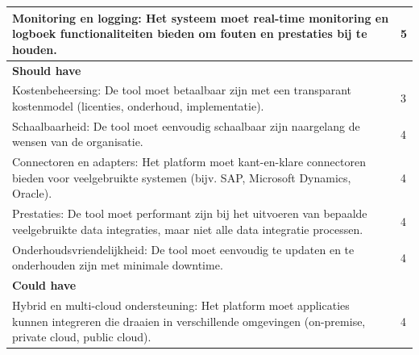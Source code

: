 \begin{landscape}
\begin{table}[H]
{\begin{tabular}{|ll|}
\multicolumn{1}{|l|}{Monitoring en logging: Het systeem moet real-time monitoring en logboek functionaliteiten bieden om fouten en prestaties bij te houden.}                                                              & 5                            \\ \hline
\textbf{Should have}                                                                                                                                                                                                       &                              \\ \hline
\multicolumn{1}{|l|}{Kostenbeheersing: De tool moet betaalbaar zijn met een transparant kostenmodel (licenties, onderhoud, implementatie).}                                                                                & 3                            \\ \hline
\multicolumn{1}{|l|}{Schaalbaarheid: De tool moet eenvoudig schaalbaar zijn naargelang de wensen van de organisatie.}                                                                                                      & 4                            \\ \hline
\multicolumn{1}{|l|}{Connectoren en adapters: Het platform moet kant-en-klare connectoren bieden voor veelgebruikte systemen (bijv. SAP, Microsoft Dynamics, Oracle).}                                                     & 4                            \\ \hline
\multicolumn{1}{|l|}{Prestaties: De tool moet performant zijn bij het uitvoeren van bepaalde veelgebruikte data integraties, maar niet alle data integratie processen.}                                                    & 4                            \\ \hline
\multicolumn{1}{|l|}{Onderhoudsvriendelijkheid: De tool moet eenvoudig te updaten en te onderhouden zijn met minimale downtime.}                                                                                           & 4                            \\ \hline
\textbf{Could have}                                                                                                                                                                                                        &                              \\ \hline
\multicolumn{1}{|l|}{Hybrid en multi-cloud ondersteuning: Het platform moet applicaties kunnen integreren die draaien in verschillende omgevingen (on-premise, private cloud, public cloud).}                              & 4                            \\ \hline

\end{tabular}}
\end{table}
\end{landscape}
